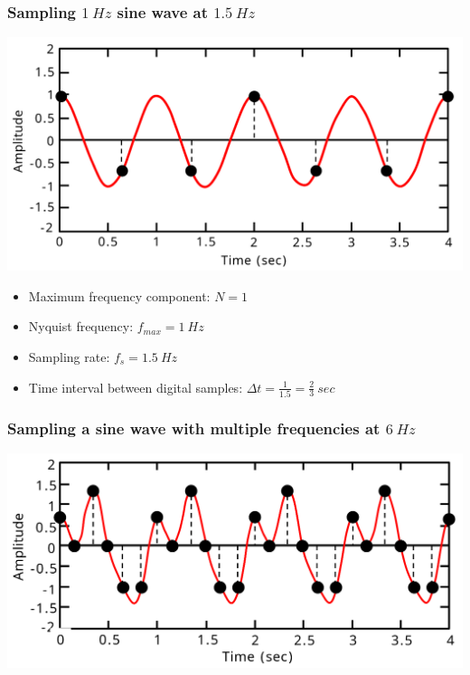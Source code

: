 \documentclass[11pt]{article}
\begin{document}
\subsubsection{Sampling \(\qty{1}{Hz}\) sine wave at \(\qty{1.5}{Hz}\)}
\label{sec:org9e75fc3}
\begin{center}
\includegraphics[width=.9\linewidth]{./images/sampling-1hz-sine-wave-at-1.5hz.png}
\end{center}

\begin{itemize}
\item Maximum frequency component: \(N = 1\)
\item Nyquist frequency: \(f_{max} = \qty{1}{Hz}\)
\item Sampling rate: \(f_s = \qty{1.5}{Hz}\)
\item Time interval between digital samples: \(\Delta t = \frac{1}{1.5} = \frac{2}{3} \ \unit{sec}\)
\end{itemize}
\subsubsection{Sampling a sine wave with multiple frequencies at \(\qty{6}{Hz}\)}
\label{sec:org62dcb3b}
\begin{center}
\includegraphics[width=.9\linewidth]{./images/sampling-sine-wave-with-muliple-frequencies-at-6hz.png}
\end{center}
\end{document}
